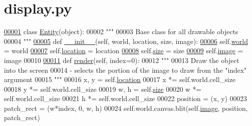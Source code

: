 \hypertarget{display_8py_source}{\section{display.\+py}
}

\begin{DoxyCode}
\hypertarget{display_8py_source_l00001}{}\hyperlink{namespacedisplay}{00001} \textcolor{keyword}{class }\hyperlink{classdisplay_1_1Entity}{Entity}(object):
00002     \textcolor{stringliteral}{"""}
00003 \textcolor{stringliteral}{    Base class for all drawable objects}
00004 \textcolor{stringliteral}{    """}
\hypertarget{display_8py_source_l00005}{}\hyperlink{classdisplay_1_1Entity_a10294b5b8a8fa95f95f29aaf521efd56}{00005}     \textcolor{keyword}{def }\hyperlink{classdisplay_1_1Entity_a10294b5b8a8fa95f95f29aaf521efd56}{\_\_init\_\_}(self, world, location, size, image):
\hypertarget{display_8py_source_l00006}{}\hyperlink{classdisplay_1_1Entity_ad7e3284bfb984c309b35d5a077bd5b21}{00006}         self.\hyperlink{classdisplay_1_1Entity_ad7e3284bfb984c309b35d5a077bd5b21}{world} = world
\hypertarget{display_8py_source_l00007}{}\hyperlink{classdisplay_1_1Entity_ae2a1114b0c54ef7eb43c2bd6cd097258}{00007}         self.\hyperlink{classdisplay_1_1Entity_ae2a1114b0c54ef7eb43c2bd6cd097258}{location} = location
\hypertarget{display_8py_source_l00008}{}\hyperlink{classdisplay_1_1Entity_aa56fd9b8bb6c9510f24ea13be8c6a218}{00008}         self.\hyperlink{classdisplay_1_1Entity_aa56fd9b8bb6c9510f24ea13be8c6a218}{size} = size
\hypertarget{display_8py_source_l00009}{}\hyperlink{classdisplay_1_1Entity_a244569c285ad924e6200d4c1c8b4639c}{00009}         self.\hyperlink{classdisplay_1_1Entity_a244569c285ad924e6200d4c1c8b4639c}{image} = image
00010 
\hypertarget{display_8py_source_l00011}{}\hyperlink{classdisplay_1_1Entity_abbea5f77f08ce3347010d9c452440737}{00011}     \textcolor{keyword}{def }\hyperlink{classdisplay_1_1Entity_abbea5f77f08ce3347010d9c452440737}{render}(self, index=0):
00012         \textcolor{stringliteral}{"""}
00013 \textcolor{stringliteral}{        Draw the object into the screen}
00014 \textcolor{stringliteral}{            - selects the portion of the image to draw from the "index" argument}
00015 \textcolor{stringliteral}{        """}
00016         x, y = self.\hyperlink{classdisplay_1_1Entity_ae2a1114b0c54ef7eb43c2bd6cd097258}{location}
00017         x *= self.world.cell\_size
00018         y *= self.world.cell\_size
00019         w, h = self.\hyperlink{classdisplay_1_1Entity_aa56fd9b8bb6c9510f24ea13be8c6a218}{size}
00020         w *= self.world.cell\_size
00021         h *= self.world.cell\_size
00022         position = (x, y)
00023         patch\_rect = (w*index, 0, w, h)
00024         self.world.canvas.blit(self.\hyperlink{classdisplay_1_1Entity_a244569c285ad924e6200d4c1c8b4639c}{image}, position, patch\_rect)
\end{DoxyCode}
